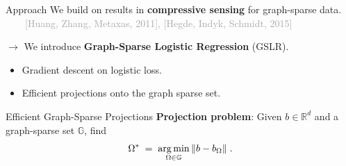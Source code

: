 \documentclass[svgnames,final]{beamer}
\newcommand{\thetatilde}{\ensuremath{\tilde{\theta}}}
\newcommand{\R}{\ensuremath{\mathbb{R}}}
\newcommand{\thetahat}{\ensuremath{\hat{\theta}}}
\DeclareMathOperator*{\argmin}{arg\,min}
\DeclarePairedDelimiter{\norm}{\lVert}{\rVert}
\begin{document}
\begin{frame}
\begin{columns}[T]
\begin{column}{.3\linewidth}

	\begin{block}{Approach}
    We build on results in \textbf{compressive sensing} for graph-sparse data.\\[.3cm]
		$\qquad$\textcolor{darkgray}{[Huang, Zhang, Metaxas, 2011], [Hegde, Indyk, Schmidt, 2015]}
		\vspace{1.2cm}

		$\rightarrow$ We introduce \textbf{Graph-Sparse Logistic Regression} (GSLR).\\[.2cm]
		\begin{itemize}
			\item Gradient descent on logistic loss.\\[.2cm]
			\item Efficient projections onto the graph sparse set.
		\end{itemize}

		\vspace{1cm}

	\end{block}

	\vspace{1.0cm}

	\begin{block}{Efficient Graph-Sparse Projections}
	\vspace{-.5cm}
	\textbf{Projection problem}: Given $b \in \R^d$ and a graph-sparse set $\mathbb{G}$, find
	{\Large
	\[
		\Omega^* \; = \; \argmin_{\Omega \in \mathbb{G}} \, \norm{b  - b_{\Omega}} \; .
	\]
	}
	
	\end{block}
\end{column}


\end{columns}
\end{frame}
\end{document}
